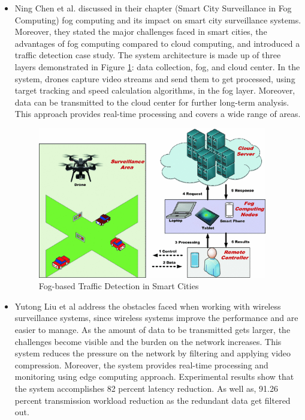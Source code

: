 \documentclass[12pt]{article}
\begin{document}
\begin{itemize}
\item Ning Chen et al. \cite{chen2017smart} discussed in their chapter (Smart City Surveillance in Fog Computing) fog computing and its impact on smart city surveillance systems. Moreover, they stated the major challenges faced in smart cities, the advantages of fog computing compared to cloud computing, and introduced a traffic detection case study. The system architecture is made up of three layers demonstrated in Figure \ref{fog}: data collection, fog, and cloud center. In the system, drones capture video streams and send them to get processed, using target tracking and speed calculation algorithms, in the fog layer. Moreover, data can be transmitted to the cloud center for further long-term analysis. This approach provides real-time processing and covers a wide range of areas.
\begin{figure}[htp]
    \centering
    \includegraphics[width=10cm]{336804_1_En_9_Fig3_HTML.png}
    \caption{Fog-based Traffic Detection in Smart Cities}
    \label{fog}
\end{figure}
\newpage
\item Yutong Liu et al \cite{liu2019litedge} address the obstacles faced when working with wireless surveillance systems, since wireless systems improve the performance and are easier to manage. As the amount of data to be transmitted gets larger, the challenges become visible and the burden on the network increases. This system reduces the pressure on the network by filtering and applying video compression. Moreover, the system provides real-time processing and monitoring using edge computing approach. Experimental results show that the system accomplishes 82 percent latency reduction. As well as, 91.26 percent transmission workload reduction as the redundant data get filtered out.

\end{itemize}
\end{document}
